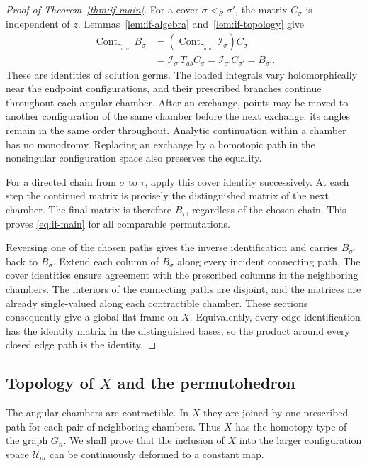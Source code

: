 \documentclass[12pt]{amsart}
\theoremstyle{definition}
\numberwithin{equation}{section}
\theoremstyle{definition}
\let\mc\mathcal
\let\gm\gamma
\let\si\sigma
\def\beq{\begin{equation}}
\def\eeq{\end{equation}}
\begin{document}
\begin{proof}[Proof of Theorem~\ref{thm:if-main}]
For a cover $\si\lessdot_R\si'$, the matrix $C_\si$ is independent
of $z$. Lemmas~\ref{lem:if-algebra} and~\ref{lem:if-topology} give
\beq
 \begin{aligned}
 \operatorname{Cont}_{\gm_{\si,\si'}}B_\si
 &=\left(\operatorname{Cont}_{\gm_{\si,\si'}}\mc I_\si\right)C_\si\\
 &=\mc I_{\si'}T_{ab}C_\si
  =\mc I_{\si'}C_{\si'}=B_{\si'}.
 \end{aligned}
\eeq
These are identities of solution germs. The loaded integrals vary
holomorphically near the endpoint configurations, and their prescribed
branches continue throughout each angular chamber. After an exchange, points may be moved to another configuration
of the same chamber before the next exchange: its angles remain
in the same order throughout. Analytic continuation within a chamber
has no monodromy. Replacing an exchange by a homotopic path in the
nonsingular configuration space also preserves the equality.

For a directed chain from $\si$ to $\tau$, apply this cover identity
successively. At each step the continued matrix is precisely the
distinguished matrix of the next chamber. The final matrix is
therefore $B_\tau$, regardless of the chosen chain. This proves
\eqref{eq:if-main} for all comparable permutations.

Reversing one of the chosen paths gives the inverse identification
and carries $B_{\si'}$ back to $B_\si$. Extend each column of
$B_\si$ along every incident connecting path. The cover identities
ensure agreement with the prescribed columns in the neighboring
chambers. The interiors of the connecting paths are disjoint, and
the matrices are already single-valued along each contractible
chamber. These sections consequently give a global flat frame on
$X$. Equivalently, every edge identification has the identity matrix
in the distinguished bases, so the product around every closed edge
path is the identity.
\end{proof}

\subsection{Topology of \texorpdfstring{$X$}{X} and the permutohedron}
\label{subsec:if-topology}

The angular chambers are contractible. In $X$ they are joined by
one prescribed path for each pair of neighboring chambers. Thus
$X$ has the homotopy type of the graph $G_n$. We shall prove that
the inclusion of $X$ into the larger configuration space $\mc U_m$
can be continuously deformed to a constant map.
\end{document}
